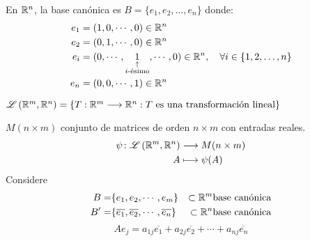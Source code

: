 En $\mathbb{R}^{n}$, la base canónica es $B = \{ e_1, e_2, \ldots, e_n \}$ donde:
\[
	\begin{aligned}
		e_1 & = (1,0,\cdots,0) \in \mathbb{R}^{n}                  \\
		e_2 & = (0,1,\cdots,0) \in \mathbb{R}^{n}                  \\
		e_i & = (0,\cdots, \underset{\substack{\uparrow \\ i\text{-ésimo}}}{1},\cdots,0) \in \mathbb{R}^{n}, \quad \forall i \in \{1,2,\ldots,n\} \\
		e_n & = (0,0,\cdots,1) \in \mathbb{R}^{n}
	\end{aligned}
\]


$\mathscr{L}\left( \mathbb{R}^{m}, \mathbb{R}^{n} \right) = \{T: \mathbb{R}^{m} \longrightarrow \mathbb{R}^{n} : T
	\text{ es una transformación lineal}\}$

$M(n\times m)$  conjunto de matrices de orden $n\times m $ con entradas reales.
\begin{align*}
	\psi \colon \mathscr{L}\left( \mathbb{R}^{m}, \mathbb{R}^{n} \right) & \longrightarrow M(n\times m) \\
	A                             & \longmapsto \psi(A)
\end{align*}
Considere \begin{align*}
	B =  & \{ e_1, e_2, \cdots, e_m\}                                   & \subset \mathbb{R}^{m} \text{base canónica} \\
	B' = & \{ \overline{e_1} , \overline{e_2}, \cdots, \overline{e_n}\} & \subset \mathbb{R}^{n} \text{base canónica} \\
\end{align*}
$$
	Ae_j = a_{1j}\overline{e_1}+a_{2j}\overline{e_2}+\cdots+a_{nj}\overline{e_n}
$$

